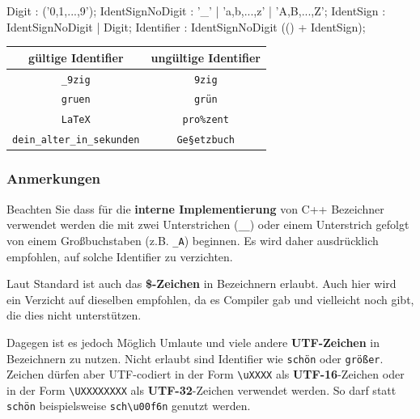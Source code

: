 \documentclass[a4paper]{report}
\begin{document}
\begin{multicols}{2}
	\begin{rail}
		Digit : ('0,1,...,9');
		IdentSignNoDigit : '\_' | 'a,b,...,z' | 'A,B,...,Z';
		IdentSign : IdentSignNoDigit | Digit;
		Identifier : IdentSignNoDigit (() + IdentSign);
	\end{rail}
	\vspace{1ex}
	\begin{center}
		\begin{tabular}{|c|c|}
			\hline
			\textbf{gültige Identifier} & \textbf{ungültige Identifier} \\ \hline
			\texttt{\_9zig} & \texttt{9zig} \\
			\texttt{gruen} & \texttt{grün} \\
			\texttt{LaTeX} & \texttt{pro\%zent} \\
			\texttt{dein\_alter\_in\_sekunden} & \texttt{Ge\textrm{§}etzbuch} \\
			\hline
		\end{tabular}
	\end{center}

\subsubsection{Anmerkungen}
	Beachten Sie dass für die \textbf{interne Implementierung} von C++ Bezeichner verwendet werden die mit zwei Unterstrichen (\texttt{\_\_}) oder einem Unterstrich gefolgt von einem Großbuchstaben (z.B. \texttt{\_A}) beginnen. Es wird daher ausdrücklich empfohlen, auf solche Identifier zu verzichten.
	
	Laut Standard ist auch das \textbf{\$-Zeichen} in Bezeichnern erlaubt. Auch hier wird ein Verzicht auf dieselben empfohlen, da es Compiler gab und vielleicht noch gibt, die dies nicht unterstützen.
	
	Dagegen ist es jedoch Möglich Umlaute und viele andere \textbf{UTF-Zeichen} in Bezeichnern zu nutzen. Nicht erlaubt sind Identifier wie \texttt{schön} oder \texttt{größer}. Zeichen dürfen aber UTF-codiert in der Form \texttt{\textrm{\textbackslash}uXXXX} als \textbf{UTF-16}-Zeichen oder in der Form \texttt{\textrm{\textbackslash}UXXXXXXXX} als \textbf{UTF-32}-Zeichen verwendet werden. So darf statt \texttt{schön} beispielsweise \texttt{sch\textrm{\textbackslash}u00f6n} genutzt werden.
\end{multicols}
\end{document}
